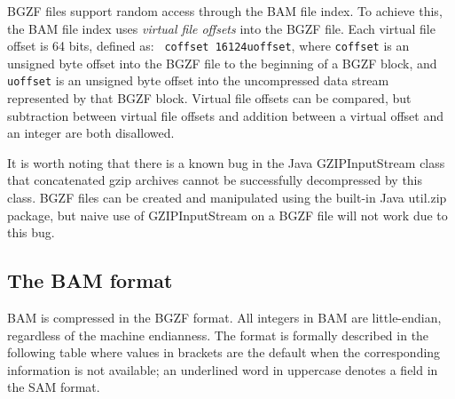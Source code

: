 \documentclass[10pt]{article}
\begin{document}
BGZF files support random access through the BAM file index. To achieve
this, the BAM file index uses \emph{virtual file offsets} into the BGZF
file. Each virtual file offset is 64 bits, defined as: {\tt
  coffset 16\char124uoffset}, where {\tt coffset} is an
unsigned byte offset into the BGZF file to the beginning of a BGZF
block, and {\tt uoffset} is an unsigned byte offset into the
uncompressed data stream represented by that BGZF block. Virtual file
offsets can be compared, but subtraction between virtual file offsets
and addition between a virtual offset and an integer are both
disallowed.

It is worth noting that there is a known bug in the Java {\sf
  GZIPInputStream} class that concatenated gzip archives cannot be
successfully decompressed by this class. BGZF files can be created and
manipulated using the built-in Java {\sf util.zip} package, but naive
use of {\sf GZIPInputStream} on a BGZF file will not work due to this
bug.

\subsection{The BAM format}
BAM is compressed in the BGZF format. All integers in BAM are
little-endian, regardless of the machine endianness. The format is
formally described in the following table where values in brackets are
the default when the corresponding information is not available; an
underlined word in uppercase denotes a field in the SAM format.
\end{document}
